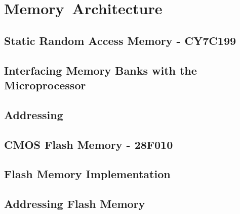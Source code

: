 \section{Memory Architecture}

    \subsection{Static Random Access Memory - CY7C199}

    \subsection{Interfacing Memory Banks with the Microprocessor}

    \subsection{Addressing}

    \subsection{CMOS Flash Memory - 28F010}

    \subsection{Flash Memory Implementation}

    \subsection{Addressing Flash Memory}

